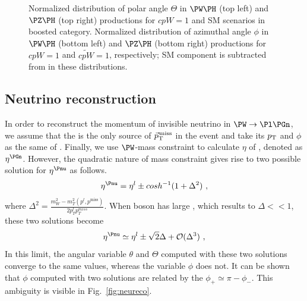 \documentclass[a4paper,11pt]{article}
\begin{document}
\begin{figure}[hbtp]
\begin{center}
\end{center}
\caption{
Normalized distribution of polar angle $\Theta$ in $\PW\PH$ (top left) and $\PZ\PH$ (top right) productions for $cpW=1$ and SM scenarios in boosted category. 
Normalized distribution of azimuthal angle $\phi$ in  $\PW\PH$ (bottom left) and $\PZ\PH$ (bottom right) productions for $cpW=1$ and $\tilde{cpW}=1$, respectively; SM component is subtracted from in these distributions.
}
\label{fig:angles}
\end{figure}


\subsection{Neutrino reconstruction}
\label{sec:neu_reco}

In order to reconstruct the momentum of invisible neutrino in $\PW \to \Pl \Pgn$, we assume that the \Pnu is the only source of ${\vec p}_{\mathrm{T}}^{\kern1pt\text{miss}}$ in the event and take its $p_{\mathrm{T}}$ and $\phi$ as the same of \Pnu. 
Finally, we use $\PW$-mass constraint to calculate $\eta$ of \Pnu, denoted as ${\eta}^{\Pgn}$. However, the quadratic nature of mass constraint gives rise to two possible solution for  ${\eta}^{\Pnu}$ as follows.
\begin{equation}
 {\eta}^{\Pnu} = {\eta}^{l} \pm cosh^{-1}(1+{\Delta}^2)	\ ,
\label{Eq:NeuEta}
\end{equation}
where ${\Delta}^2 = \frac{m_W^2 - m_T^2 ({p^l},{p^\text{miss}\xspace})}{2 p_T^{l} p_T^{miss}}$. 
When \PW boson has large \pt, which results to $\Delta << 1$, these two solutions become 
\begin{equation}
{\eta}^{\Pnu} \simeq {\eta}^{l} \pm \sqrt{2}{\Delta} + {\cal{O}} ({\Delta}^3)	\ ,
\label{Eq:NeuEta2}
\end{equation}
In this limit,  the angular variable $\theta$ and $\Theta$ computed with these two solutions converge to the same values, whereas the variable $\phi$ does not. 
It can be shown that $\phi$ computed with two solutions are related by the $\phi_{+} \simeq \pi - \phi_{-}$. This ambiguity is visible in Fig.~\ref{fig:neureco}.
\end{document}
